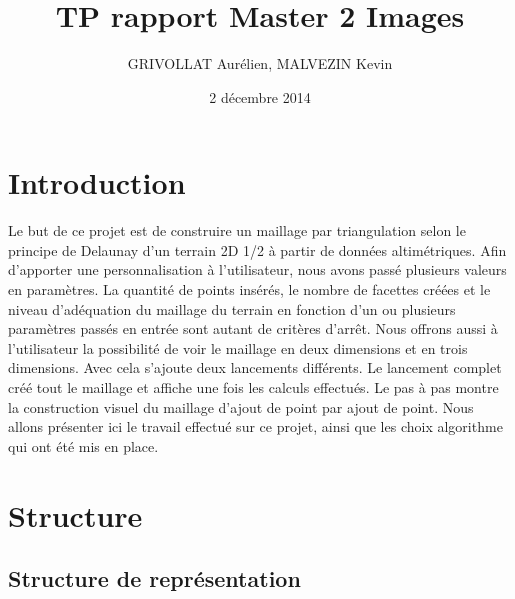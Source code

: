 \documentclass[10pt,a4paper]{report}
\title{TP rapport Master 2 Images}
\author{GRIVOLLAT Aurélien, MALVEZIN Kevin}
\date{2 décembre 2014}
\begin{document}
\maketitle

\chapter{Introduction}

\hspace*{10mm} Le but de ce projet est de construire un maillage par triangulation selon le principe de Delaunay d'un terrain 2D 1/2 à partir de données altimétriques. 
	\newline \newline
\hspace*{10mm}Afin d'apporter une personnalisation à l'utilisateur, nous avons passé plusieurs valeurs en paramètres. La quantité de points insérés, le nombre de facettes créées et le niveau d'adéquation du maillage du terrain en fonction d'un ou plusieurs paramètres passés en entrée sont autant de critères d'arrêt.
	\newline\newline
\hspace*{10mm}Nous offrons aussi à l'utilisateur la possibilité de voir le maillage en deux dimensions et en trois dimensions. Avec cela s'ajoute deux lancements différents. Le lancement complet créé tout le maillage et affiche une fois les calculs effectués. Le pas à pas montre la construction visuel du maillage d'ajout de point par ajout de point.
Nous allons présenter ici le travail effectué sur ce projet, ainsi que les choix algorithme qui ont été mis en place.

\chapter{Structure}

	\section{Structure de représentation}
	
\end{document}
